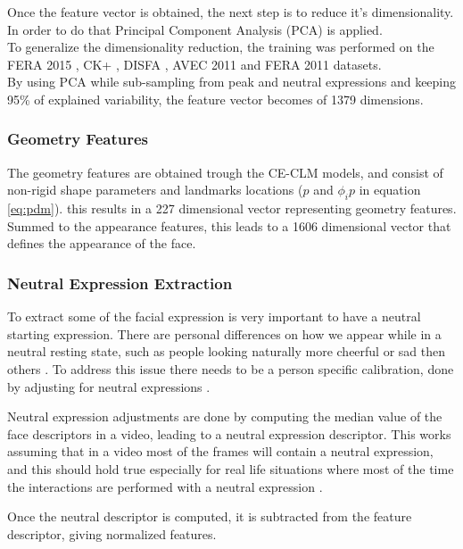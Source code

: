 Once the feature vector is obtained, the next step is to reduce it's dimensionality. In order to do that Principal Component Analysis (PCA) is applied. \\
To generalize the dimensionality reduction, the training was performed on the FERA 2015 \cite{FERA15}, CK+ \cite{CK+}, DISFA \cite{DISFA}, AVEC 2011 \cite{AVEC11} and FERA 2011 \cite{FERA11} datasets. \\
By using PCA while sub-sampling from peak and neutral expressions and keeping 95\% of explained variability, the feature vector becomes of 1379 dimensions.

\subsubsection{Geometry Features}
The geometry features are obtained trough the CE-CLM models, and consist of non-rigid shape parameters and landmarks locations ($p$ and $ \phi_i p$ in equation \ref{eq:pdm}). this results in a 227 dimensional vector representing geometry features.\\
Summed to the appearance features, this leads to a 1606 dimensional vector that defines the appearance of the face.

\subsubsection{Neutral Expression Extraction}
To extract some of the facial expression is very important to have a neutral starting expression. There are personal differences on how we appear while in a neutral resting state, such as people looking naturally more cheerful or sad then others \cite{normexpr}. To address this issue there needs to be a person specific calibration, done by adjusting for neutral expressions \cite{Baltru2013}.

Neutral expression adjustments are done by computing the median value of the face descriptors in a video, leading to a neutral expression descriptor. This works assuming that in a video most of the frames will contain a neutral expression, and this should hold true especially for real life situations where most of the time the interactions are performed with a neutral expression \cite{NatAffData}.

Once the neutral descriptor is computed, it is subtracted from the feature descriptor, giving normalized features. 

